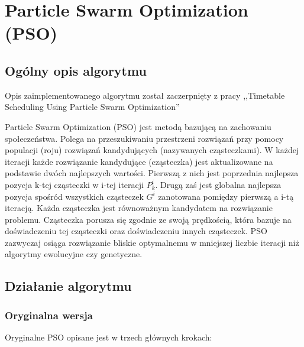 
\section{Particle Swarm Optimization (PSO)}
\author{Paweł Jastrzębski}
\subsection{Ogólny opis algorytmu}
\par Opis zaimplementowanego algorytmu został zaczerpnięty z pracy ,,Timetable Scheduling Using Particle Swarm Optimization'' \cite{pso}
\par Particle Swarm Optimization (PSO) jest metodą bazującą na zachowaniu społeczeństwa. Polega na przeszukiwaniu przestrzeni rozwiązań przy pomocy populacji (roju) rozwiązań kandydujących (nazywanych cząsteczkami). W każdej iteracji każde rozwiązanie kandydujące (cząsteczka) jest aktualizowane na podstawie dwóch najlepszych wartości. Pierwszą z nich jest poprzednia najlepsza pozycja k-tej cząsteczki w i-tej iteracji ${P}^{i}_{k}$. Drugą zaś jest globalna najlepsza pozycja spośród wszystkich cząsteczek ${G}^{i}$ zanotowana pomiędzy pierwszą a i-tą iteracją. Każda cząsteczka jest równoważnym kandydatem na rozwiązanie problemu. Cząsteczka porusza się zgodnie ze swoją prędkością, która bazuje na doświadczeniu tej cząsteczki oraz doświadczeniu innych cząsteczek. PSO zazwyczaj osiąga rozwiązanie bliskie optymalnemu w mniejszej liczbie iteracji niż algorytmy ewolucyjne czy genetyczne.  
\subsection{Działanie algorytmu}
\subsubsection{Oryginalna wersja}
\par Oryginalne PSO opisane jest w trzech głównych krokach:

